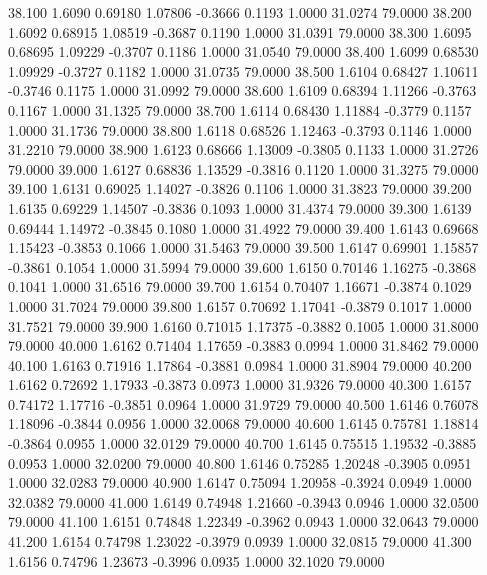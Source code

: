   38.100   1.6090   0.69180   1.07806  -0.3666   0.1193   1.0000  31.0274  79.0000
  38.200   1.6092   0.68915   1.08519  -0.3687   0.1190   1.0000  31.0391  79.0000
  38.300   1.6095   0.68695   1.09229  -0.3707   0.1186   1.0000  31.0540  79.0000
  38.400   1.6099   0.68530   1.09929  -0.3727   0.1182   1.0000  31.0735  79.0000
  38.500   1.6104   0.68427   1.10611  -0.3746   0.1175   1.0000  31.0992  79.0000
  38.600   1.6109   0.68394   1.11266  -0.3763   0.1167   1.0000  31.1325  79.0000
  38.700   1.6114   0.68430   1.11884  -0.3779   0.1157   1.0000  31.1736  79.0000
  38.800   1.6118   0.68526   1.12463  -0.3793   0.1146   1.0000  31.2210  79.0000
  38.900   1.6123   0.68666   1.13009  -0.3805   0.1133   1.0000  31.2726  79.0000
  39.000   1.6127   0.68836   1.13529  -0.3816   0.1120   1.0000  31.3275  79.0000
  39.100   1.6131   0.69025   1.14027  -0.3826   0.1106   1.0000  31.3823  79.0000
  39.200   1.6135   0.69229   1.14507  -0.3836   0.1093   1.0000  31.4374  79.0000
  39.300   1.6139   0.69444   1.14972  -0.3845   0.1080   1.0000  31.4922  79.0000
  39.400   1.6143   0.69668   1.15423  -0.3853   0.1066   1.0000  31.5463  79.0000
  39.500   1.6147   0.69901   1.15857  -0.3861   0.1054   1.0000  31.5994  79.0000
  39.600   1.6150   0.70146   1.16275  -0.3868   0.1041   1.0000  31.6516  79.0000
  39.700   1.6154   0.70407   1.16671  -0.3874   0.1029   1.0000  31.7024  79.0000
  39.800   1.6157   0.70692   1.17041  -0.3879   0.1017   1.0000  31.7521  79.0000
  39.900   1.6160   0.71015   1.17375  -0.3882   0.1005   1.0000  31.8000  79.0000
  40.000   1.6162   0.71404   1.17659  -0.3883   0.0994   1.0000  31.8462  79.0000
  40.100   1.6163   0.71916   1.17864  -0.3881   0.0984   1.0000  31.8904  79.0000
  40.200   1.6162   0.72692   1.17933  -0.3873   0.0973   1.0000  31.9326  79.0000
  40.300   1.6157   0.74172   1.17716  -0.3851   0.0964   1.0000  31.9729  79.0000
  40.500   1.6146   0.76078   1.18096  -0.3844   0.0956   1.0000  32.0068  79.0000
  40.600   1.6145   0.75781   1.18814  -0.3864   0.0955   1.0000  32.0129  79.0000
  40.700   1.6145   0.75515   1.19532  -0.3885   0.0953   1.0000  32.0200  79.0000
  40.800   1.6146   0.75285   1.20248  -0.3905   0.0951   1.0000  32.0283  79.0000
  40.900   1.6147   0.75094   1.20958  -0.3924   0.0949   1.0000  32.0382  79.0000
  41.000   1.6149   0.74948   1.21660  -0.3943   0.0946   1.0000  32.0500  79.0000
  41.100   1.6151   0.74848   1.22349  -0.3962   0.0943   1.0000  32.0643  79.0000
  41.200   1.6154   0.74798   1.23022  -0.3979   0.0939   1.0000  32.0815  79.0000
  41.300   1.6156   0.74796   1.23673  -0.3996   0.0935   1.0000  32.1020  79.0000
